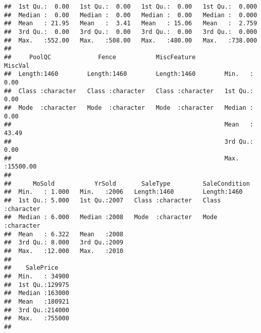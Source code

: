 \documentclass[
]{article}
\newenvironment{Shaded}{\begin{snugshade}}{\end{snugshade}}
\newcommand{\CommentTok}[1]{\textcolor[rgb]{0.56,0.35,0.01}{\textit{#1}}}
\newcommand{\FunctionTok}[1]{\textcolor[rgb]{0.00,0.00,0.00}{#1}}
\newcommand{\NormalTok}[1]{#1}
\newcommand{\OtherTok}[1]{\textcolor[rgb]{0.56,0.35,0.01}{#1}}
\newcommand{\SpecialCharTok}[1]{\textcolor[rgb]{0.00,0.00,0.00}{#1}}
\newcommand{\StringTok}[1]{\textcolor[rgb]{0.31,0.60,0.02}{#1}}
\begin{document}
\begin{verbatim}
##  1st Qu.:  0.00   1st Qu.:  0.00   1st Qu.:  0.00   1st Qu.:  0.000  
##  Median :  0.00   Median :  0.00   Median :  0.00   Median :  0.000  
##  Mean   : 21.95   Mean   :  3.41   Mean   : 15.06   Mean   :  2.759  
##  3rd Qu.:  0.00   3rd Qu.:  0.00   3rd Qu.:  0.00   3rd Qu.:  0.000  
##  Max.   :552.00   Max.   :508.00   Max.   :480.00   Max.   :738.000  
##                                                                      
##     PoolQC             Fence           MiscFeature           MiscVal        
##  Length:1460        Length:1460        Length:1460        Min.   :    0.00  
##  Class :character   Class :character   Class :character   1st Qu.:    0.00  
##  Mode  :character   Mode  :character   Mode  :character   Median :    0.00  
##                                                           Mean   :   43.49  
##                                                           3rd Qu.:    0.00  
##                                                           Max.   :15500.00  
##                                                                             
##      MoSold           YrSold       SaleType         SaleCondition     
##  Min.   : 1.000   Min.   :2006   Length:1460        Length:1460       
##  1st Qu.: 5.000   1st Qu.:2007   Class :character   Class :character  
##  Median : 6.000   Median :2008   Mode  :character   Mode  :character  
##  Mean   : 6.322   Mean   :2008                                        
##  3rd Qu.: 8.000   3rd Qu.:2009                                        
##  Max.   :12.000   Max.   :2010                                        
##                                                                       
##    SalePrice     
##  Min.   : 34900  
##  1st Qu.:129975  
##  Median :163000  
##  Mean   :180921  
##  3rd Qu.:214000  
##  Max.   :755000  
## 
\end{verbatim}

\begin{Shaded}
\end{Shaded}
\end{document}
